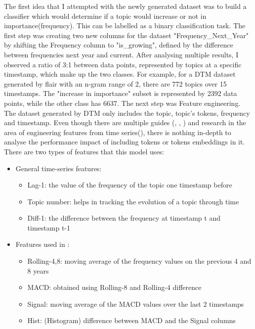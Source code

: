 \documentclass[12pt,MSc,a4paper,oneside]{muthesis}
\begin{document}
The first idea that I attempted with the newly generated dataset was to build a classifier which would determine if a topic would increase or not in importance(frequency). This can be labelled as a binary classification task. The first step was creating two new columns for the dataset "Frequency\_Next\_Year" by shifting the Frequency column to "is\_growing", defined by the difference between frequencies next year and current. After analysing multiple results, I observed a ratio of 3:1 between data points, represented by topics at a specific timestamp, which make up the two classes. For example, for a DTM dataset generated by flair with an n-gram range of 2, there are 772 topics over 15 timestamps. The "increase in importance" subset is represented by 2392 data points, while the other class has 6637. 
The next step was Feature engineering. The dataset generated by DTM only includes the topic, topic's tokens, frequency and timestamp. Even though there are multiple guides (\cite{basic-fea-timeseries}, \cite{fea-timeseries}, \cite{a-guide-to-feature-engineering-time-series-tsfresh}) and research in the area of engineering features from time series(\cite{Tang2020EnrichingFE}), there is nothing in-depth to analyse the performance impact of including tokens or tokens embeddings in it. There are two types of features that this model uses:
\begin{itemize}
    \item General time-series features:
        \begin{itemize}
            \item Lag-1: the value of the frequency of the topic one timestamp before
            \item Topic number: helps in tracking the evolution of a topic through time
            \item Diff-1: the difference between the frequency at timestamp t and timestamp t-1
        \end{itemize}
    \item Features used in \cite{Tattershall2019DetectingBT}:
        \begin{itemize}
            \item Rolling-4,8: moving average of the frequency values on the previous 4 and 8 years
            \item MACD: obtained using Rolling-8 and Rolling-4 difference
            \item Signal: moving average of the MACD values over the last 2 timestamps
            \item Hist: (Histogram) difference between MACD and the Signal columns
        \end{itemize}
\end{itemize}
\end{document}
